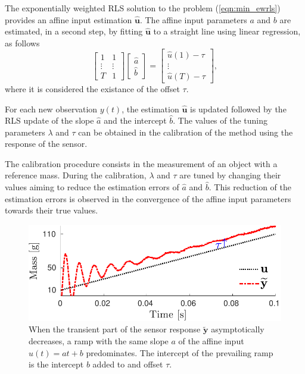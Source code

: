 The exponentially weighted RLS solution to the problem (\ref{eqn:min_ewrls}) provides an affine input  estimation $\widehat{\mathbf{u}}$. 
The affine input parameters $a$ and $b$ are estimated, in a second step, by fitting $\widehat{\mathbf{u}}$ to a straight line using linear regression, as follows
\begin{equation} 
  \begin{bmatrix} 1 & 1  \\ \vdots & \vdots \\ T & 1 \end{bmatrix} 
  \begin{bmatrix} \widehat{a} \\ \widehat{b}  \end{bmatrix} = 
  \begin{bmatrix} \widehat{u}(1)-\tau \\ \vdots \\ \widehat{u}(T)-\tau \end{bmatrix}, \label{eqn:LS}
\end{equation}
where it is considered the existance of the offset $\tau$.   

For each new observation $y(t)$, the estimation $\widehat{\mathbf{u}}$ is updated followed by the RLS update of the slope $\widehat{a}$ and the intercept $\widehat{b}$.
The values of the tuning parameters $\lambda$ and $\tau$ can be obtained in the calibration of the method using the response of the sensor.

The calibration procedure consists in the measurement of an object with a reference mass.
During the calibration, $\lambda$ and $\tau$ are tuned by changing their values aiming to reduce the estimation errors of $\widehat{a}$ and $\widehat{b}$.
This reduction of the estimation errors is observed in the convergence of the affine input parameters towards their true values.

\begin{figure}[!htbp]
\centering
\includegraphics[width=1\columnwidth]{./ChapterRampInput/fig/Fig_2_1.pdf} 
\caption{ \label{fig:sensor_response} When the transient part of the sensor response $\widetilde{\mathbf{y}}$ asymptotically decreases, a ramp with the same slope $a$ of the  affine input $u(t) = at+b$ predominates. The intercept of the prevailing ramp is the intercept $b$ added to and offset $\tau$.}
\end{figure}


